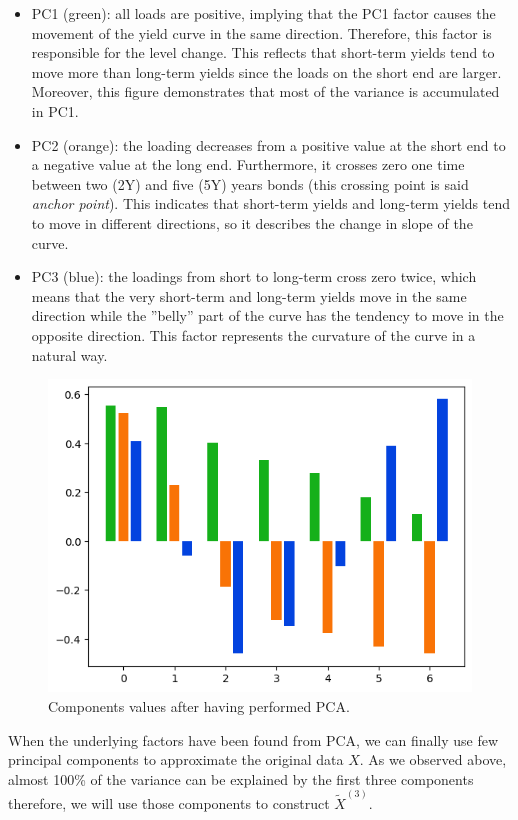 \begin{itemize}
\item PC1 (green): all loads are positive, implying that the PC1 factor causes the movement of the yield curve in the same direction. Therefore, this factor is responsible for the level change. This reflects that short-term yields tend to move more than long-term yields since the loads on the short end are larger. Moreover, this figure demonstrates that most of the variance is accumulated in PC1.
\item PC2 (orange): the loading decreases from a positive value at the short end to a negative value at the long end. Furthermore, it crosses zero one time between two (2Y) and five (5Y) years bonds (this crossing point is said \emph{anchor point}). This indicates that short-term yields and long-term yields tend to move in different directions, so it describes the change in slope of the curve.
\item PC3 (blue): the loadings from short to long-term cross zero twice, which means that the very short-term and long-term yields move in the same direction while the ”belly” part of the curve has the tendency to move in the opposite direction. This factor represents the curvature of the curve in a natural way.
\end{itemize}
	
\begin{figure}[hbtp]
	\centering
	\includegraphics[width=0.7\linewidth]{figures/pca_loading_matrix}
	\caption{Components values after having performed PCA.}
	\label{fig:yield_pca_components}
\end{figure}

When the underlying factors have been found from PCA, we can finally use few principal components to approximate the original data $X$. As we observed above, almost 100\% of the variance can be explained by the first three components therefore, we will use those components to construct $\tilde{X}^{(3)}$.

